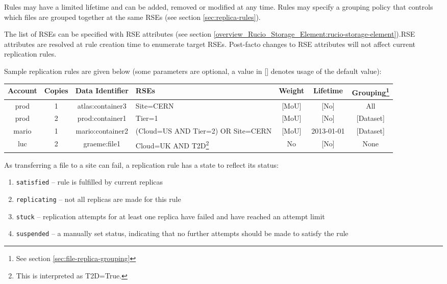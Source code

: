 \documentclass{atlasnote}
\begin{document}
Rules may have a limited lifetime and can be added, removed or modified at any time. Rules may specify a grouping policy that controls which files are grouped together at the same RSEs (see section \ref{sec:replica-rules}).

The list of RSEs can be specified with RSE attributes (see section \ref{overview_Rucio_Storage_Element:rucio-storage-element}).RSE attributes are resolved at rule creation time to enumerate target RSEs. Post-facto changes to RSE attributes will not affect current replication rules.

Sample replication rules are given below (some parameters are optional, a value in [] denotes usage of the default value):

\begin{minipage}{12cm}
\begin{tabular}{c c c p{2cm} c c c}
\toprule
\textbf{Account} & \textbf{Copies} & \textbf{Data Identifier} & \textbf{RSEs} & \textbf{Weight} & \textbf{Lifetime} & \textbf{Grouping\footnote{See section \ref{sec:file-replica-grouping} }} \\
\midrule
prod & 1 & atlas:container3 & Site=CERN & [MoU] & [No] & All \\
prod & 2 & prod:container1 & Tier=1 & [MoU] & [No] & [Dataset] \\
mario & 1 & mario:container2 & (Cloud=US AND Tier=2) OR Site=CERN & [MoU] & 2013-01-01 & [Dataset] \\
luc & 2 & graeme:file1 & Cloud=UK AND T2D\footnote{This is interpreted as T2D=True.} & No & [No] & None \\
\bottomrule
\end{tabular}
\end{minipage}

As transferring a file to a site can fail, a replication rule has a state to reflect its status:

\begin{enumerate}
\item[] \texttt{satisfied} -- rule is fulfilled by current replicas
\item[] \texttt{replicating} -- not all replicas are made for this rule
\item[] \texttt{stuck} -- replication attempts for at least one replica have failed and have reached an attempt limit
\item[] \texttt{suspended} -- a manually set status, indicating that no further attempts should be made to satisfy the rule
\end{enumerate}
\end{document}
